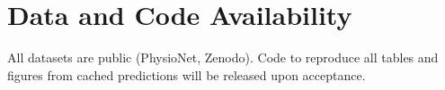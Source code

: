 \documentclass[conference,a4paper]{IEEEtran}
\begin{document}
\section*{Data and Code Availability}
All datasets are public (PhysioNet, Zenodo).
\ifblind
Code to reproduce all tables and figures from cached predictions will be released upon acceptance.
\fi



\end{document}
